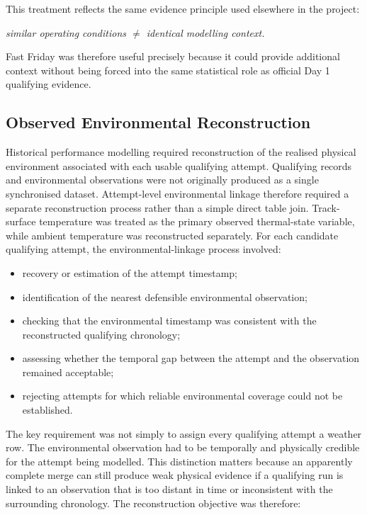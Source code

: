 This treatment reflects the same evidence principle used elsewhere in the project:

\begin{center}\textit{similar operating conditions \ensuremath{\neq} identical modelling context.}\end{center}

Fast Friday was therefore useful precisely because it could provide additional context without being forced into the same statistical role as official Day 1 qualifying evidence.

\subsection{Observed Environmental Reconstruction}
Historical performance modelling required reconstruction of the realised physical environment associated with each usable qualifying attempt. Qualifying records and environmental observations were not originally produced as a single synchronised dataset. Attempt-level environmental linkage therefore required a separate reconstruction process rather than a simple direct table join. Track-surface temperature was treated as the primary observed thermal-state variable, while ambient temperature was reconstructed separately. For each candidate qualifying attempt, the environmental-linkage process involved:

\begin{itemize}
\item recovery or estimation of the attempt timestamp;
\item identification of the nearest defensible environmental observation;
\item checking that the environmental timestamp was consistent with the reconstructed qualifying chronology;
\item assessing whether the temporal gap between the attempt and the observation remained acceptable;
\item rejecting attempts for which reliable environmental coverage could not be established.
\end{itemize}

The key requirement was not simply to assign every qualifying attempt a weather row. The environmental observation had to be temporally and physically credible for the attempt being modelled. This distinction matters because an apparently complete merge can still produce weak physical evidence if a qualifying run is linked to an observation that is too distant in time or inconsistent with the surrounding chronology. The reconstruction objective was therefore:

